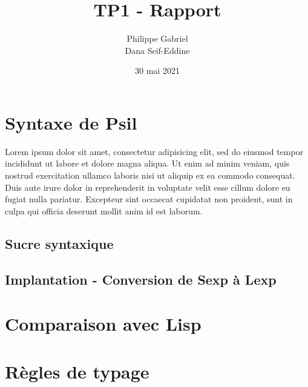 \documentclass[12pt, titlepage]{article}
\title{{\Huge \textbf{TP1 - Rapport}}}
\author{Philippe Gabriel \\ Dana Seif-Eddine}
\date{30 mai 2021}
\begin{document}
\maketitle

\section{Syntaxe de Psil}

Lorem ipsum dolor sit amet, consectetur adipisicing elit, sed do eiusmod tempor incididunt ut labore et dolore magna aliqua. Ut enim ad minim veniam, quis nostrud exercitation ullamco laboris nisi ut aliquip ex ea commodo consequat. Duis aute irure dolor in reprehenderit in voluptate velit esse cillum dolore eu fugiat nulla pariatur. Excepteur sint occaecat cupidatat non proident, sunt in culpa qui officia deserunt mollit anim id est laborum.

\subsection{Sucre syntaxique}

\subsection{Implantation - Conversion de Sexp à Lexp}

\section{Comparaison avec Lisp}

\section{Règles de typage}
\end{document}
